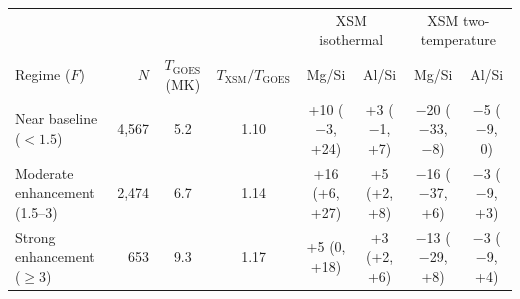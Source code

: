 \begin{tabular}{lrcccccc}
\toprule
 & & & & \multicolumn{2}{c}{XSM isothermal} & \multicolumn{2}{c}{XSM two-temperature}\\
Regime ($F$) & $N$ & $T_\mathrm{GOES}$ (MK) & $T_\mathrm{XSM}/T_\mathrm{GOES}$ & Mg/Si & Al/Si & Mg/Si & Al/Si\\
\midrule
Near baseline ($<1.5$) & 4{,}567 & 5.2 & 1.10 & +10 ($-$3, +24) & +3 ($-$1, +7) & $-$20 ($-$33, $-$8) & $-$5 ($-$9, 0)\\
Moderate enhancement (1.5--3) & 2{,}474 & 6.7 & 1.14 & +16 (+6, +27) & +5 (+2, +8) & $-$16 ($-$37, +6) & $-$3 ($-$9, +3)\\
Strong enhancement ($\geq3$) & 653 & 9.3 & 1.17 & +5 (0, +18) & +3 (+2, +6) & $-$13 ($-$29, +8) & $-$3 ($-$9, +4)\\
\bottomrule
\end{tabular}
